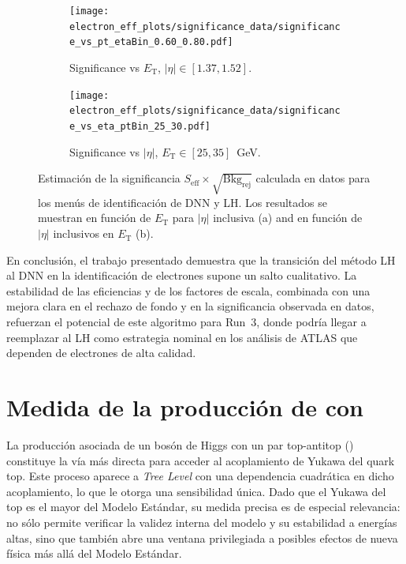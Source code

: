 \begin{figure}[h]
  \centering

  \begin{subfigure}{0.48\textwidth}
    \centering
    \texttt{[image: electron\_eff\_plots/significance\_data/significance\_vs\_pt\_etaBin\_0.60\_0.80.pdf]}
    \caption{\small{Significance vs $E_{\mathrm{T}}$, $|\eta|\in[1.37,1.52]$.}}
    \label{res:significance_vs_pt_etaBin}
  \end{subfigure}\hfill
  \begin{subfigure}{0.48\textwidth}
    \centering
    \texttt{[image: electron\_eff\_plots/significance\_data/significance\_vs\_eta\_ptBin\_25\_30.pdf]}
    \caption{\small{Significance vs $|\eta|$, $E_{\mathrm{T}}\in[25,35]$~GeV.}}
    \label{res:significance_vs_eta_ptBin}
  \end{subfigure}

  \caption{Estimación de la significancia $S_{\mathrm{eff}} \times \sqrt{\mathrm{Bkg}_{\mathrm{rej}}}$ 
  calculada en datos para los menús de identificación de DNN y LH. 
  Los resultados se muestran en función de $E_{\mathrm{T}}$ para $|\eta|$ inclusiva (a) and en función de $|\eta|$ inclusivos en $E_{\mathrm{T}}$ (b).}
  \label{res:significance_bins}
\end{figure}


En conclusión, el trabajo presentado demuestra que la transición del método LH al DNN en la identificación de electrones supone un salto cualitativo. La estabilidad de las eficiencias y de los factores de escala, combinada con una mejora clara en el rechazo de fondo y en la significancia observada en datos, refuerzan el potencial de este algoritmo para Run~3, donde podría llegar a reemplazar al LH como estrategia nominal en los análisis de ATLAS que dependen de electrones de alta calidad. 

\FloatBarrier

\section*{Medida de la producción de \ttH con \htautau}

La producción asociada de un bosón de Higgs con un par top-antitop (\ttH) constituye la vía más directa para acceder al acoplamiento de Yukawa del quark top. Este proceso aparece a \textit{Tree Level} con una dependencia cuadrática en dicho acoplamiento, lo que le otorga una sensibilidad única. Dado que el Yukawa del top es el mayor del Modelo Estándar, su medida precisa es de especial relevancia: no sólo permite verificar la validez interna del modelo y su estabilidad a energías altas, sino que también abre una ventana privilegiada a posibles efectos de nueva física más allá del Modelo Estándar.  

